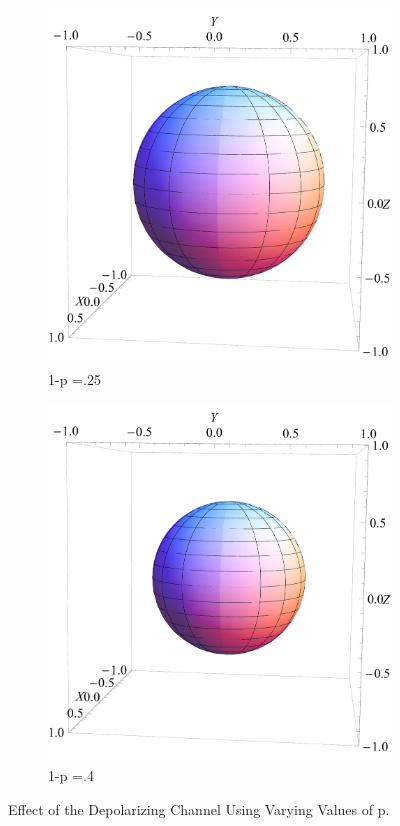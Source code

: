 \documentclass[letterpaper,twoside,10pt]{article}
\begin{document}
\begin{figure}[H]
\begin{subfigure}{.3\textwidth}
		\includegraphics[width=\columnwidth,natwidth=550,natheight=550]{./Depolarizing/DepolarizingPoint25.pdf}%
		\caption{1-p =.25}%
	\end{subfigure}
	\begin{subfigure}{.3\textwidth}
		\includegraphics[width=\columnwidth,natwidth=550,natheight=550]{./Depolarizing/DepolarizingPoint4.pdf}%
		\caption{1-p =.4}%
	\end{subfigure}
	\caption{Effect of the Depolarizing Channel Using Varying Values of p.}
\end{figure}
\end{document}
